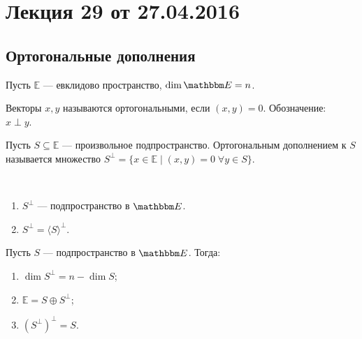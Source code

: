 


\renewcommand{\f}{\mathbb{f}}
\newcommand{\ort}{\mathrm{ort}}
\newcommand{\pr}{\mathrm{pr}}

\section{Лекция 29 от 27.04.2016}
\subsection*{Ортогональные дополнения}
Пусть $\mathbb{E}$ --- евклидово пространство, $\dim \E = n$.
\begin{Def}
	Векторы $x,y$ называются ортогональными, если $(x,y)=0$. Обозначение: \\$x\perp y$. 
\end{Def}

\begin{Def}
	Пусть $S \subseteq \mathbb{E}$ --- произвольное подпространство. Ортогональным дополнением к $S$ называется множество $S^{\perp} = \{x\in \mathbb{E}\; |\; (x,y) = 0\;\forall y \in S\}$.
\end{Def}

\begin{Comment}\
	\begin{enumerate}
		\item $S^\perp$ --- подпространство в $\E$.
		\item $S^\perp = \langle S \rangle^\perp$.
	\end{enumerate}
\end{Comment}

\begin{Suggestion}
Пусть $S$ --- подпространство в $\E$. Тогда:
	\begin{enumerate}
		\item $\dim S^\perp = n - \dim S$;
		\item $\mathbb{E} = S \oplus S^\perp$;
		\item $(S^\perp)^\perp = S$.
	\end{enumerate}
\end{Suggestion}

